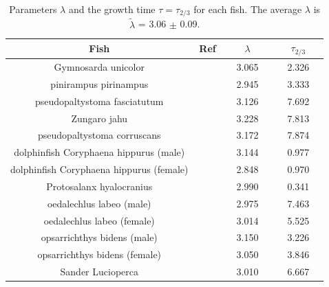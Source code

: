 \begin{table}%
\centering
\begin{tabular}{|c|c|c|c|}
\hline
Fish                                     & Ref                                                       & $\lambda$                     & $\tau_{2/3}$                  \\ \hline
Gymnosarda unicolor                      & ~~\cite{Joshi12}~~& ~~3.065~~ & ~~2.326~~ \\
pinirampus pirinampus                    & \cite{Mateus07}                        & 2.945                         & 3.333                         \\
pseudopaltystoma fasciatutum             & \cite{Mateus07}                        & 3.126                         & 7.692                         \\
Zungaro jahu                             & \cite{Mateus07}                        & 3.228                         & 7.813                         \\
pseudopaltystoma corruscans              & \cite{Mateus07}                        & 3.172                         & 7.874                         \\
dolphinfish Coryphaena hippurus (male)   & \cite{Alejo-Plata11}                   & 3.144                         & 0.977                         \\
dolphinfish Coryphaena hippurus (female) & \cite{Alejo-Plata11}                   & 2.848                         & 0.970                         \\
Protosalanx hyalocranius                 & \cite{Tang12}                          & 2.990                         & 0.341                         \\
oedalechlus labeo (male)                 & \cite{Matic-Skoko12}                   & 2.975                         & 7.463                         \\
oedalechlus labeo (female)               & \cite{Matic-Skoko12}                   & 3.014                         & 5.525                         \\
opsarrichthys bidens (male)              & \cite{Sui12}                           & 3.150                         & 3.226                         \\
opsarrichthys bidens (female)            & \cite{Sui12}                           & 3.050                         & 3.846                         \\
Sander Lucioperca                        & \cite{Perez-Bote12}                    & 3.010                         & 6.667                         \\ \hline
\end{tabular}
\caption{Parameters $\lambda$ and the growth time $\tau=\tau_{2/3}$ for each fish.  The average $\lambda$ is $\tilde{\lambda}$ = 3.06 $\pm$ 0.09.}
\label{tab1}
\end{table}  


